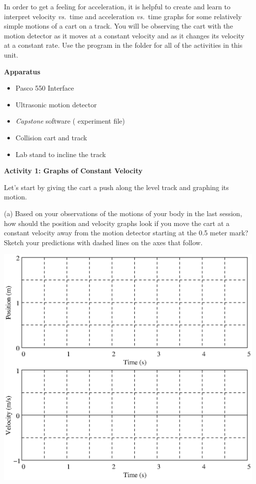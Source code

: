 In order to get a feeling for acceleration, it is helpful to create and learn
to interpret velocity \textit{vs.}~time and acceleration \textit{vs.}~time graphs for some relatively
simple motions of a cart on a track. You will be observing the cart with the
motion detector as it moves at a constant velocity and as it changes its velocity
at a constant rate. Use the 
 program in the \filename{\coursefolder} folder
for all of the activities in this unit.

\bigskip
\textbf{Apparatus} 
\vspace{-\parskip}
\begin{itemize}
\item Pasco 550 Interface
\item Ultrasonic motion detector 
\item \textit{Capstone} software ( experiment file)
\item Collision cart and track 
\item Lab stand to incline the track 
\end{itemize}

\textbf{Activity 1: Graphs of Constant Velocity} 

Let's start by giving the cart a push along the level track and graphing its
motion. 

(a) Based on your observations of the motions of your body in the last session,
how should the position and velocity graphs look if you move the cart at a constant
velocity away from the motion detector starting at the 0.5 meter mark? Sketch
your predictions with dashed lines on the axes that follow.

{\par\centering \includegraphics[scale=1]{changing/changing_fig1.eps} \par}
\vspace{-0.1in}

